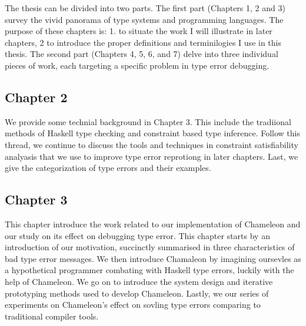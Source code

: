 The thesis can be divided into two parts. The first part (Chapters 1, 2 and 3) survey the vivid panorama of type systems and programming languages. The purpose of these chapters is: 1. to situate the work I will illustrate in later chapters, 2 to introduce the proper definitions and terminilogies I use in this thesis.  The second part (Chapters 4, 5, 6, and 7) delve into three individual pieces of work, each targeting a specific problem in type error debugging.





\subsection{Chapter 2}
We provide some technial background in Chapter 3. This include the tradiional methods of Haskell type checking and constraint based type inference. Follow this thread, we continue to discuss the tools and techniques in constraint satisfiability analyasis that we use to improve type error reprotiong in later chapters. Last, we give the categorization of type errors and their examples. 

\subsection{Chapter 3}
This chapter introduce the work related to our implementation of Chameleon and our study on its effect on debugging type error. This chapter starts by an introduction of our motivation, succinctly summarised in three characteristics of bad type error messages. We then introduce Chamaleon by imagining oursevles as a hypothetical programmer combating with Haskell type errors, luckily with the help of Chameleon. We go on to introduce the system design and iterative prototyping methods used to develop Chameleon. Lastly, we our series of experiments on Chameleon's effect on sovling type errors comparing to traditional compiler tools. 


